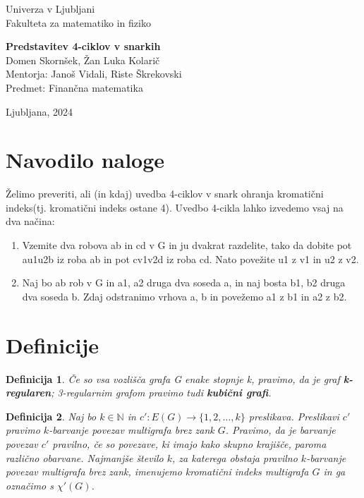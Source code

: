 \documentclass[a4paper,12pt]{article}
\newtheorem{definicija}{Definicija}
\begin{document}
	\thispagestyle{empty}
	{\large
		\noindent Univerza v Ljubljani\\[1mm]
		Fakulteta za matematiko in fiziko\\[5mm]}
	\vfill
	
	\begin{center}{\Large
			{\bf Predstavitev 4-ciklov v snarkih}\\[2mm]
			Domen Skornšek, Žan Luka Kolarič\\[10mm]
			Mentorja: Janoš Vidali, Riste Škrekovski\\[2mm]
			Predmet: Finančna matematika \\[2mm]}
	\end{center}
	\vfill
	
	{\large
		Ljubljana, 2024}
	\pagebreak
	
	\section{Navodilo naloge}
	Želimo preveriti, ali (in kdaj) uvedba 4-ciklov v snark ohranja kromatični
	indeks(tj. kromatični indeks ostane 4). Uvedbo 4-cikla lahko izvedemo
	vsaj na dva načina:
	\begin{enumerate}
		\item Vzemite dva robova ab in cd v G in ju dvakrat razdelite, tako da dobite
		pot au1u2b iz roba ab in pot cv1v2d iz roba cd. Nato povežite u1 z v1
		in u2 z v2.
		\item Naj bo ab rob v G in a1, a2 druga dva soseda a, in naj bosta b1, b2
		druga dva soseda b. Zdaj odstranimo vrhova a, b in povežemo a1 z b1
		in a2 z b2.
	\end{enumerate}
	
	\section{Definicije}
	\begin{definicija}
		Če so vsa vozlišča grafa G enake stopnje
		k, pravimo, da je graf \textbf{k-regularen}; 3-regularnim grafom pravimo tudi \textbf{kubični grafi}.
	\end{definicija}
	
	\begin{definicija}
		Naj bo $k \in \mathbb{N}$ in $c': E(G) \to \{1, 2, \dots, k\}$ preslikava. Preslikavi $c'$ pravimo \textit{$k$-barvanje povezav} multigrafa brez zank $G$. Pravimo, da je barvanje povezav $c'$ \textit{pravilno}, če so povezave, ki imajo kako skupno krajišče, paroma različno obarvane. Najmanjše število $k$, za katerega obstaja pravilno $k$-barvanje povezav multigrafa brez zank, imenujemo \textit{kromatični indeks} multigrafa $G$ in ga označimo s $\chi'(G)$.
	\end{definicija}
	
\end{document}
